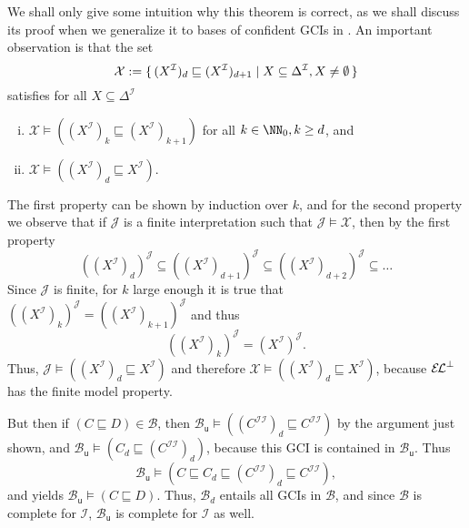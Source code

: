We shall only give some intuition why this theorem is correct, as we shall discuss its
proof when we generalize it to bases of confident GCIs in .
An important observation is that the set
\begin{equation*}
  \mathcal{X} := {\{\, (X^{\mathcal{I}})_d \sqsubseteq (X^{\mathcal{I}})_{d+1} \mid X
    \subseteq \Delta^{\mathcal{I}}, X \neq \emptyset \,\}}
\end{equation*}
satisfies for all $X \subseteq \Delta^{\mathcal{I}}$
\begin{enumerate}[i. ]
\item $\mathcal{X} \models ( (X^{\mathcal{I}})_k \sqsubseteq (X^{\mathcal{I}})_{k+1} )$
  for all $k \in \NN_0, k \geq d$, and
\item $\mathcal{X} \models ( (X^{\mathcal{I}})_d \sqsubseteq X^{\mathcal{I}} )$.
\end{enumerate}
The first property can be shown by induction over $k$, and for the second property we
observe that if $\mathcal{J}$ is a finite interpretation such that $\mathcal{J} \models
\mathcal{X}$, then by the first property
\begin{equation*}
  ((X^{\mathcal{I}})_d)^{\mathcal{J}} \subseteq ((X^{\mathcal{I}})_{d+1})^{\mathcal{J}}
  \subseteq ((X^{\mathcal{I}})_{d+2})^{\mathcal{J}} \subseteq \dots
\end{equation*}
Since $\mathcal{J}$ is finite, for $k$ large enough it is true that
$((X^{\mathcal{I}})_k)^{\mathcal{J}} = ((X^{\mathcal{I}})_{k+1})^{\mathcal{J}}$ and thus
\begin{equation*}
  ((X^{\mathcal{I}})_k)^{\mathcal{J}} = (X^{\mathcal{I}})^{\mathcal{J}}.
\end{equation*}
Thus, $\mathcal{J} \models ( (X^{\mathcal{I}})_d \sqsubseteq X^{\mathcal{I}} )$ and
therefore $\mathcal{X} \models ( (X^{\mathcal{I}})_d \sqsubseteq X^{\mathcal{I}} )$,
because ${{\mathcal{E}\kern-.3ex\mathcal{L}}^\bot}$ has the finite model property.

But then if $(C \sqsubseteq D) \in \mathcal{B}$, then $\mathcal{B}_{\mathsf{u}} \models (
(C^{\mathcal{I}\mathcal{I}})_d \sqsubseteq C^{\mathcal{I}\mathcal{I}})$ by the argument
just shown, and $\mathcal{B}_{\mathsf{u}} \models ( C_d \sqsubseteq
(C^{\mathcal{I}\mathcal{I}})_d )$, because this GCI is contained in
$\mathcal{B}_{\mathsf{u}}$.  Thus
\begin{equation*}
  \mathcal{B}_{\mathsf{u}} \models ( C \sqsubseteq C_d \sqsubseteq (C^{\mathcal{I}\mathcal{I}})_d
  \sqsubseteq C^{\mathcal{I}\mathcal{I}}),
\end{equation*}
and  yields $\mathcal{B}_{\mathsf{u}} \models (C
\sqsubseteq D)$.  Thus, $\mathcal{B}_d$ entails all GCIs in $\mathcal{B}$, and since
$\mathcal{B}$ is complete for $\mathcal{I}$, $\mathcal{B}_{\mathsf{u}}$ is complete for
$\mathcal{I}$ as well.


